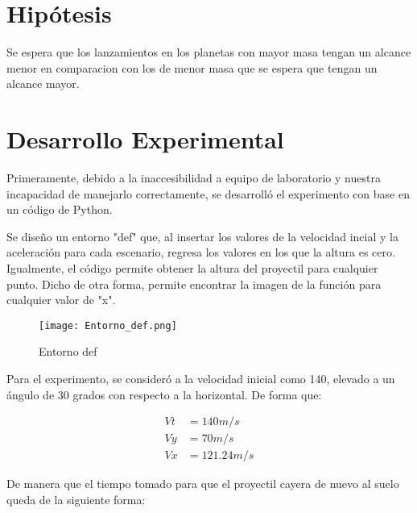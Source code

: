 \documentclass{article}
\begin{document}
\section{Hip\'otesis }
Se espera que los lanzamientos en los planetas con mayor masa tengan un alcance menor en comparacion con los de menor masa que se espera que tengan un alcance mayor.
 
\section{Desarrollo Experimental}
Primeramente, debido a la inaccesibilidad a equipo de laboratorio y nuestra incapacidad de manejarlo correctamente, se desarroll\'o el experimento con base en un código de Python.


Se dise\~no un entorno "def" que, al insertar los valores de la velocidad incial y la aceleraci\'on para cada escenario, regresa los valores en los que la altura es cero. Igualmente, el c\'odigo permite obtener la altura del proyectil para cualquier punto. Dicho de otra forma, permite encontrar la imagen de la funci\'on para cualquier valor de "x".

\begin{figure}[h!]
    \centering
    \texttt{[image: Entorno\_def.png]}
    \caption{Entorno def}
    \label{fig:Entorno_def.}
\end{figure}

Para el experimento, se consideró a la velocidad inicial como 140, elevado a un \'angulo de 30 grados con respecto  a la horizontal. De forma que:

\begin{align*}
    Vt &= 140 m/s\\
    Vy &= 70 m/s\\
    Vx &= 121.24 m/s
\end{align*}

De manera que el tiempo tomado para que el proyectil cayera de nuevo al suelo queda de la siguiente forma:
\end{document}

